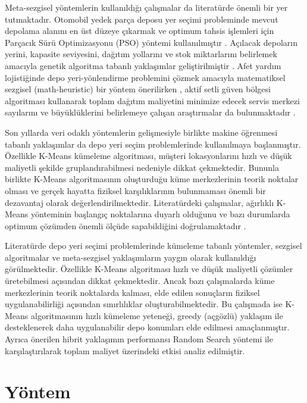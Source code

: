 \documentclass[conference]{IEEEtran}
\begin{document}
Meta-sezgisel yöntemlerin kullanıldığı çalışmalar da literatürde önemli bir yer tutmaktadır. Otomobil yedek parça deposu yer seçimi probleminde mevcut depolama alanını en üst düzeye çıkarmak ve optimum tahsis işlemleri için Parçacık Sürü Optimizasyonu (PSO) yöntemi kullanılmıştır \cite{yaobao2013improved}. Açılacak depoların yerini, kapasite seviyesini, dağıtım yollarını ve stok miktarlarını belirlemek amacıyla genetik algoritma tabanlı yaklaşımlar geliştirilmiştir \cite{askin2014multi}. Afet yardım lojistiğinde depo yeri-yönlendirme problemini çözmek amacıyla matematiksel sezgisel (math-heuristic) bir yöntem önerilirken \cite{rath2014math}, aktif setli güven bölgesi algoritması kullanarak toplam dağıtım maliyetini minimize edecek servis merkezi sayılarını ve büyüklüklerini belirlemeye çalışan araştırmalar da bulunmaktadır \cite{aboelnaga2017active}.
 
Son yıllarda veri odaklı yöntemlerin gelişmesiyle birlikte makine öğrenmesi tabanlı yaklaşımlar da depo yeri seçim problemlerinde kullanılmaya başlanmıştır. Özellikle K-Means kümeleme algoritması, müşteri lokasyonlarını hızlı ve düşük maliyetli şekilde gruplandırabilmesi nedeniyle dikkat çekmektedir. Bununla birlikte K-Means algoritmasının oluşturduğu küme merkezlerinin teorik noktalar olması ve gerçek hayatta fiziksel karşılıklarının bulunmaması önemli bir dezavantaj olarak değerlendirilmektedir. Literatürdeki çalışmalar, ağırlıklı K-Means yönteminin başlangıç noktalarına duyarlı olduğunu ve bazı durumlarda optimum çözümden önemli ölçüde sapabildiğini doğrulamaktadır \cite{you2019optimal}.
 
Literatürde depo yeri seçimi problemlerinde kümeleme tabanlı yöntemler, sezgisel algoritmalar ve meta-sezgisel yaklaşımların yaygın olarak kullanıldığı görülmektedir. Özellikle K-Means algoritması hızlı ve düşük maliyetli çözümler üretebilmesi açısından dikkat çekmektedir. Ancak bazı çalışmalarda küme merkezlerinin teorik noktalarda kalması, elde edilen sonuçların fiziksel uygulanabilirliği açısından sınırlılıklar oluşturabilmektedir. Bu çalışmada ise K-Means algoritmasının hızlı kümeleme yeteneği, greedy (açgözlü) yaklaşım ile desteklenerek daha uygulanabilir depo konumları elde edilmesi amaçlanmıştır. Ayrıca önerilen hibrit yaklaşımın performansı Random Search yöntemi ile karşılaştırılarak toplam maliyet üzerindeki etkisi analiz edilmiştir.

\section{Yöntem}
\end{document}
